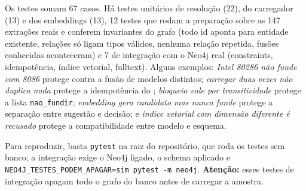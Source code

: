 Os testes somam 67 casos. Há testes unitários de resolução (22), do carregador (13) e dos embeddings (13), 12 testes que rodam a preparação sobre as 147 extrações reais e conferem invariantes do grafo (todo id aponta para entidade existente, relações só ligam tipos válidos, nenhuma relação repetida, fusões conhecidas aconteceram) e 7 de integração com o Neo4j real (constraints, idempotência, índice vetorial, fulltext). Alguns exemplos: \emph{Intel 80286 não funde com 8086} protege contra a fusão de modelos distintos; \emph{carregar duas vezes não duplica nada} protege a idempotência do ; \emph{bloqueio vale por transitividade} protege a lista \texttt{nao\_fundir}; \emph{embedding gera candidato mas nunca funde} protege a separação entre sugestão e decisão; e \emph{índice vetorial com dimensão diferente é recusado} protege a compatibilidade entre modelo e esquema.

Para reproduzir, basta \texttt{pytest} na raiz do repositório, que roda os testes sem banco; a integração exige o Neo4j ligado, o schema aplicado e \texttt{NEO4J\_TESTES\_PODEM\_APAGAR=sim pytest -m neo4j}. \textbf{Atenção:} esses testes de integração apagam todo o grafo do banco antes de carregar a amostra.
